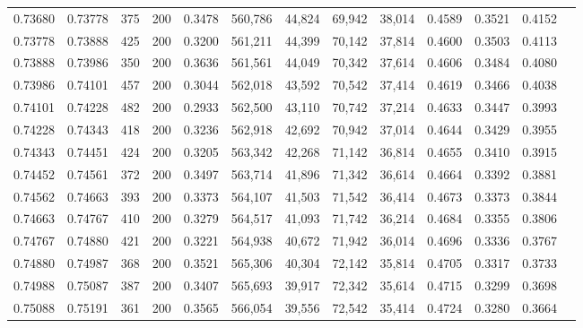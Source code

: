 \begin{tabular}{rrrrrrrrrrrrr}
0.73680 & 0.73778 &    375 & 200 &                                     0.3478 & 560,786 &  44,824 &  69,942 &  38,014 & 0.4589 & 0.3521 & 0.4152 \\
0.73778 & 0.73888 &    425 & 200 &                                     0.3200 & 561,211 &  44,399 &  70,142 &  37,814 & 0.4600 & 0.3503 & 0.4113 \\
0.73888 & 0.73986 &    350 & 200 &                                     0.3636 & 561,561 &  44,049 &  70,342 &  37,614 & 0.4606 & 0.3484 & 0.4080 \\
0.73986 & 0.74101 &    457 & 200 &                                     0.3044 & 562,018 &  43,592 &  70,542 &  37,414 & 0.4619 & 0.3466 & 0.4038 \\
0.74101 & 0.74228 &    482 & 200 &                                     0.2933 & 562,500 &  43,110 &  70,742 &  37,214 & 0.4633 & 0.3447 & 0.3993 \\
0.74228 & 0.74343 &    418 & 200 &                                     0.3236 & 562,918 &  42,692 &  70,942 &  37,014 & 0.4644 & 0.3429 & 0.3955 \\
0.74343 & 0.74451 &    424 & 200 &                                     0.3205 & 563,342 &  42,268 &  71,142 &  36,814 & 0.4655 & 0.3410 & 0.3915 \\
0.74452 & 0.74561 &    372 & 200 &                                     0.3497 & 563,714 &  41,896 &  71,342 &  36,614 & 0.4664 & 0.3392 & 0.3881 \\
0.74562 & 0.74663 &    393 & 200 &                                     0.3373 & 564,107 &  41,503 &  71,542 &  36,414 & 0.4673 & 0.3373 & 0.3844 \\
0.74663 & 0.74767 &    410 & 200 &                                     0.3279 & 564,517 &  41,093 &  71,742 &  36,214 & 0.4684 & 0.3355 & 0.3806 \\
0.74767 & 0.74880 &    421 & 200 &                                     0.3221 & 564,938 &  40,672 &  71,942 &  36,014 & 0.4696 & 0.3336 & 0.3767 \\
0.74880 & 0.74987 &    368 & 200 &                                     0.3521 & 565,306 &  40,304 &  72,142 &  35,814 & 0.4705 & 0.3317 & 0.3733 \\
0.74988 & 0.75087 &    387 & 200 &                                     0.3407 & 565,693 &  39,917 &  72,342 &  35,614 & 0.4715 & 0.3299 & 0.3698 \\
0.75088 & 0.75191 &    361 & 200 &                                     0.3565 & 566,054 &  39,556 &  72,542 &  35,414 & 0.4724 & 0.3280 & 0.3664 \\

\end{tabular}
